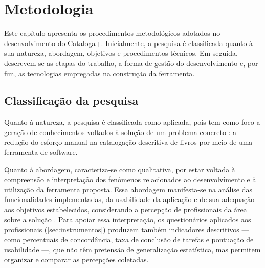 %
%

\chapter{Metodologia}
\label{cap:metodologia}

Este capítulo apresenta os procedimentos metodológicos adotados no desenvolvimento do Cataloga+. Inicialmente, a pesquisa é classificada quanto à sua natureza, abordagem, objetivos e procedimentos técnicos. Em seguida, descrevem-se as etapas do trabalho, a forma de gestão do desenvolvimento e, por fim, as tecnologias empregadas na construção da ferramenta.

\section{Classificação da pesquisa}
\label{sec:classificacao}

Quanto à natureza, a pesquisa é classificada como aplicada, pois tem como foco a geração de conhecimentos voltados à solução de um problema concreto \cite{gil2008}: a redução do esforço manual na catalogação descritiva de livros por meio de uma ferramenta de software.

Quanto à abordagem, caracteriza-se como qualitativa, por estar voltada à compreensão e interpretação dos fenômenos relacionados ao desenvolvimento e à utilização da ferramenta proposta. Essa abordagem manifesta-se na análise das funcionalidades implementadas, da usabilidade da aplicação e de sua adequação aos objetivos estabelecidos, considerando a percepção de profissionais da área sobre a solução \cite{gil2008,creswell2014}. Para apoiar essa interpretação, os questionários aplicados aos profissionais (\autoref{sec:instrumentos}) produzem também indicadores descritivos --- como percentuais de concordância, taxa de conclusão de tarefas e pontuação de usabilidade ---, que não têm pretensão de generalização estatística, mas permitem organizar e comparar as percepções coletadas.

